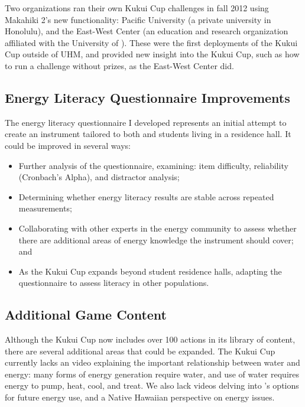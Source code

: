 Two organizations ran their own Kukui Cup challenges in fall 2012 using Makahiki 2's new functionality: \Hawaii Pacific University (a private university in Honolulu), and the East-West Center (an education and research organization affiliated with the University of \Hawaii). These were the first deployments of the Kukui Cup outside of UHM, and provided new insight into the Kukui Cup, such as how to run a challenge without prizes, as the East-West Center did.


\subsection{Energy Literacy Questionnaire Improvements}

The energy literacy questionnaire I developed represents an initial attempt to create an instrument tailored to both \Hawaii and students living in a residence hall. It could be improved in several ways:

\begin{itemize}
	\item Further analysis of the questionnaire, examining: item difficulty, reliability (Cronbach's Alpha), and distractor analysis;
	\item Determining whether energy literacy results are stable across repeated measurements;
	\item Collaborating with other experts in the \Hawaii energy community to assess whether there are additional areas of energy knowledge the instrument should cover; and
	\item As the Kukui Cup expands beyond student residence halls, adapting the questionnaire to assess literacy in other populations.
\end{itemize}


\subsection{Additional Game Content}

Although the Kukui Cup now includes over 100 actions in its library of content, there are several additional areas that could be expanded. The Kukui Cup currently lacks an video explaining the important relationship between water and energy: many forms of energy generation require water, and use of water requires energy to pump, heat, cool, and treat. We also lack videos delving into \Hawaii's options for future energy use, and a Native Hawaiian perspective on energy issues.

